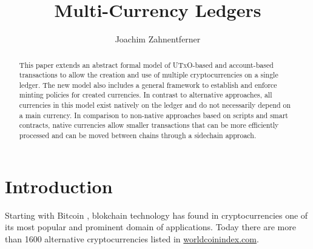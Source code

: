 \documentclass{llncs}
\newcommand{\utxo}{\textsc{UTxO}\xspace}
\begin{document}
\title{Multi-Currency Ledgers}


\author{
  Joachim Zahnentferner\\%
}




\maketitle

\begin{abstract}
This paper extends an abstract formal model of \utxo-based and account-based transactions to allow the creation and use of multiple cryptocurrencies on a single ledger. The new model also includes a general framework to establish and enforce minting policies for created currencies. In contrast to alternative approaches, all currencies in this model exist natively on the ledger and do not necessarily depend on a main currency. In comparison to non-native approaches based on scripts and smart contracts, native currencies allow smaller transactions that can be more efficiently processed and can be moved between chains through a sidechain approach.
\end{abstract}


\section{Introduction}

Starting with Bitcoin \cite{Nakamoto2008}, blokchain technology has found in cryptocurrencies one of its
most popular and prominent domain of applications. Today there are more than 1600 alternative cryptocurrencies listed in \url{worldcoinindex.com}.
\end{document}
